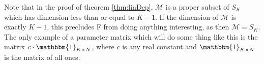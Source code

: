 Note that in the proof of theorem \ref{thm:linDep}, $\mathcal{M}$ is a proper subset of $S_K$ which has dimension less than or equal to $K-1$. If the dimension of $\mathcal{M}$ is exactly \( K-1 \), this precludes \Rpi F from doing anything interesting, as then $\mathcal{M} = S_K$.  The only example of a parameter matrix which will do some thing like this is the matrix \( c\cdot\mathbbm{1}_{K\times N} \), where \( c \) is any real constant and \( \mathbbm{1}_{K\times N} \) is the matrix of all ones.

